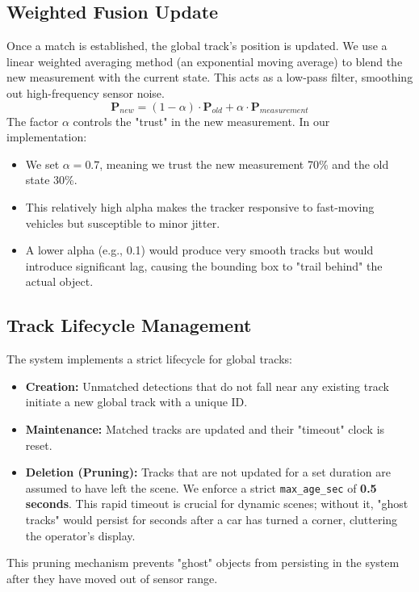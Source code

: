 \documentclass[12pt,a4paper]{report}
\begin{document}
{\subsection{Weighted Fusion Update}
Once a match is established, the global track's position is updated. We use a linear weighted averaging method (an exponential moving average) to blend the new measurement with the current state. This acts as a low-pass filter, smoothing out high-frequency sensor noise.
\begin{equation}
    \mathbf{P}_{new} = (1 - \alpha) \cdot \mathbf{P}_{old} + \alpha \cdot \mathbf{P}_{measurement}
\end{equation}
The factor $\alpha$ controls the "trust" in the new measurement. In our implementation:
\begin{itemize}
    \item We set $\alpha = 0.7$, meaning we trust the new measurement 70\% and the old state 30\%.
    \item This relatively high alpha makes the tracker responsive to fast-moving vehicles but susceptible to minor jitter.
    \item A lower alpha (e.g., 0.1) would produce very smooth tracks but would introduce significant lag, causing the bounding box to "trail behind" the actual object.
\end{itemize}

\subsection{Track Lifecycle Management}
The system implements a strict lifecycle for global tracks:
\begin{itemize}
    \item \textbf{Creation:} Unmatched detections that do not fall near any existing track initiate a new global track with a unique ID.
    \item \textbf{Maintenance:} Matched tracks are updated and their "timeout" clock is reset.
    \item \textbf{Deletion (Pruning):} Tracks that are not updated for a set duration are assumed to have left the scene. We enforce a strict \texttt{max\_age\_sec} of \textbf{0.5 seconds}. This rapid timeout is crucial for dynamic scenes; without it, "ghost tracks" would persist for seconds after a car has turned a corner, cluttering the operator's display.
\end{itemize}
This pruning mechanism prevents "ghost" objects from persisting in the system after they have moved out of sensor range.

}
\end{document}
